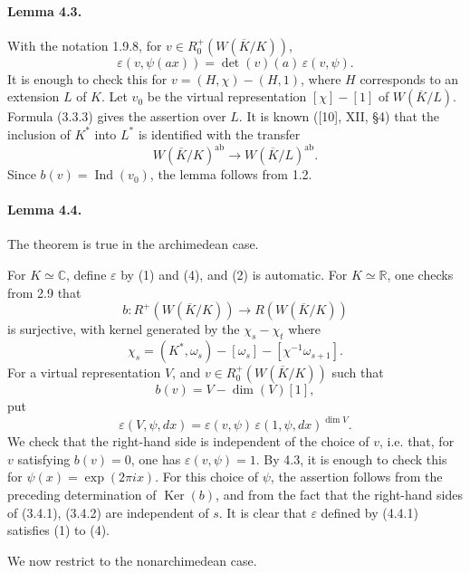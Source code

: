 \documentclass[10pt]{article}
\newcommand{\C}{\mathbb C}
\newcommand{\Ind}{\operatorname{Ind}}
\providecommand{\Ker}{\operatorname{Ker}}
\providecommand{\ab}{\mathrm{ab}}
\providecommand{\R}{\mathbb R}
\providecommand{\ab}{\mathrm{ab}}
\providecommand{\ab}{\mathrm{ab}}
\providecommand{\Ind}{\operatorname{Ind}}
\providecommand{\Ker}{\operatorname{Ker}}
\begin{document}
\paragraph{Lemma 4.3.} With the notation 1.9.8, for \(v\in R^+_0(W(\overline K/K))\),
\[
\varepsilon(v,\psi(ax))=\det(v)(a)\,\varepsilon(v,\psi).
\]
It is enough to check this for \(v=(H,\chi)-(H,1)\), where \(H\) corresponds to an extension \(L\) of \(K\). Let \(v_0\) be the virtual representation \([\chi]-[1]\) of \(W(\overline K/L)\). Formula (3.3.3) gives the assertion over \(L\). It is known ([10], XII, §4) that the inclusion of \(K^*\) into \(L^*\) is identified with the transfer
\[
W(\overline K/K)^{\ab}\longrightarrow W(\overline K/L)^{\ab}.
\]
Since \(b(v)=\Ind(v_0)\), the lemma follows from 1.2.

\paragraph{Lemma 4.4.} The theorem is true in the archimedean case.

For \(K\simeq\C\), define \(\varepsilon\) by (1) and (4), and (2) is automatic. For \(K\simeq\R\), one checks from 2.9 that
\[
b:R^+(W(\overline K/K))\longrightarrow R(W(\overline K/K))
\]
is surjective, with kernel generated by the \(\chi_s-\chi_t\) where
\[
\chi_s=(K^*,\omega_s)-[\omega_s]-[\chi^{-1}\omega_{s+1}].
\]
For a virtual representation \(V\), and \(v\in R^+_0(W(\overline K/K))\) such that
\[
b(v)=V-\dim(V)[1],
\]
put
\[
\tag{4.4.1}
\varepsilon(V,\psi,dx)=\varepsilon(v,\psi)\,\varepsilon(1,\psi,dx)^{\dim V}.
\]
We check that the right-hand side is independent of the choice of \(v\), i.e. that, for \(v\) satisfying \(b(v)=0\), one has \(\varepsilon(v,\psi)=1\). By 4.3, it is enough to check this for \(\psi(x)=\exp(2\pi ix)\). For this choice of \(\psi\), the assertion follows from the preceding determination of \(\Ker(b)\), and from the fact that the right-hand sides of (3.4.1), (3.4.2) are independent of \(s\). It is clear that \(\varepsilon\) defined by (4.4.1) satisfies (1) to (4).

We now restrict to the nonarchimedean case.


\newpage
\end{document}
